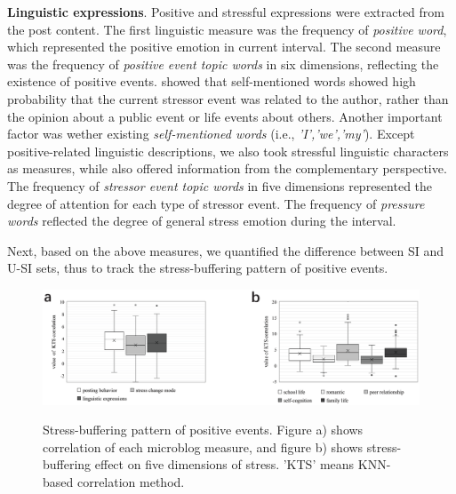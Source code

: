 \textbf{Linguistic expressions}.
Positive and stressful expressions were extracted from the post content.
The first linguistic measure was the frequency of \emph{positive word},
which represented the positive emotion in current interval.
The second measure was the frequency of \emph{positive event topic words} in six dimensions,
reflecting the existence of positive events.
\citep{Li2014Major} showed that self-mentioned words showed high probability that the current stressor event was related to the author,
rather than the opinion about a public event or life events about others.
Another important factor was wether existing \emph{self-mentioned words} (i.e., \emph{'I','we','my'}).
Except positive-related linguistic descriptions, we also took stressful linguistic characters as measures,
while also offered information from the complementary perspective.
The frequency of \emph{stressor event topic words} in five dimensions represented the degree of attention for each type of stressor event.
The frequency of \emph{pressure words} reflected the degree of general stress emotion during the interval.

Next,
based on the above measures,
we quantified the difference between SI and U-SI sets, thus to track the stress-buffering pattern of positive events.

\begin{figure}
\centering
\caption{Stress-buffering pattern of positive events. Figure a) shows correlation of each microblog measure,
and figure b) shows stress-buffering effect on five dimensions of stress. 'KTS' means KNN-based correlation method.}
\includegraphics[width=0.9\linewidth]{figs/BOX3.eps}%
\label{fig:correlation}
\end{figure}

